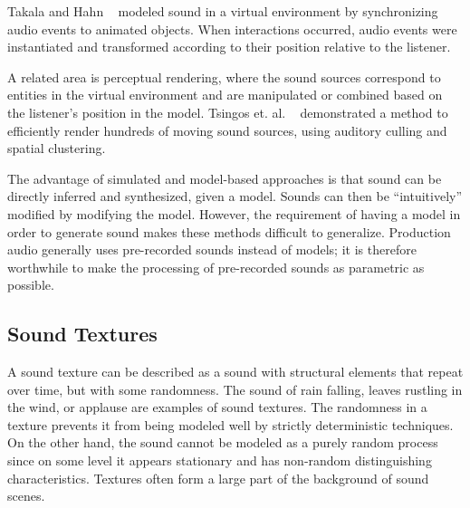 \documentclass{acmsiggraph}               %
\begin{document}
Takala and Hahn ~ modeled sound in a virtual 
environment by synchronizing audio events to animated objects. When 
interactions occurred, audio events were instantiated and transformed 
according to their position relative to the listener. 


A related area is perceptual rendering, where the sound sources 
correspond to entities in the virtual environment and are 
manipulated or combined based on the listener's position in the model. 
Tsingos et. al. ~ demonstrated a method to 
efficiently render hundreds of moving sound sources, using 
auditory culling and spatial clustering. 

The advantage of simulated and model-based approaches is that sound can be
directly inferred and synthesized, given a model. Sounds can then be 
``intuitively'' modified by modifying the model. However, the requirement 
of having a model in order to generate sound  makes these methods 
difficult to generalize. Production audio generally uses 
pre-recorded sounds instead of models; it is therefore worthwhile to make the 
processing of pre-recorded sounds as parametric as possible. 


\subsection{Sound Textures}

A sound texture can be described as a sound with structural elements 
that repeat over time, but with some randomness. The sound of rain falling, 
leaves rustling in the wind, or applause are examples of sound textures. 
The randomness in a texture prevents it from being modeled well by strictly 
deterministic techniques. On the other hand, the sound cannot be modeled 
as a purely random process since on some level it appears stationary and 
has non-random distinguishing characteristics. Textures often form a large 
part of the background of sound scenes.
\end{document}
